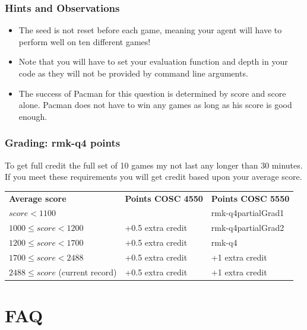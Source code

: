 \documentclass{article}
\newcommand{\points}[1]{\csname rmk-#1\endcsname}
\begin{document}
\subsubsection{Hints and Observations}

\begin{itemize}
\item The seed is not reset before each game, meaning your agent will have to perform well on ten different games!
\item Note that you will have to set your evaluation function and depth in your code as they will not be provided by command line arguments.
\item The success of Pacman for this question is determined by score and score alone. Pacman does not have to win any games as long as his score is good enough.
\end{itemize}


\subsubsection{Grading: \points{q4} points}
To get full credit the full set of 10 games my not last any longer than 30 minutes. If you meet these requirements you will get credit based upon your average score.

\vspace{10pt}
\noindent
\begin{tabular}{lll}
\textbf{Average score}              & \textbf{Points COSC 4550}     & \textbf{Points COSC 5550}\\
$score < 1100$                      &                               & \points{q4partialGrad1}\\
$1000 \leq score < 1200$            & +0.5 extra credit             & \points{q4partialGrad2}\\
$1200 \leq score < 1700$            & +0.5 extra credit             & \points{q4}\\
$1700 \leq score < 2488$            & +0.5 extra credit             & +1 extra credit\\
$2488 \leq score$ (current record)  & +0.5 extra credit             & +1 extra credit\\
\end{tabular}
\vspace{10pt}

\section{FAQ}
\end{document}
